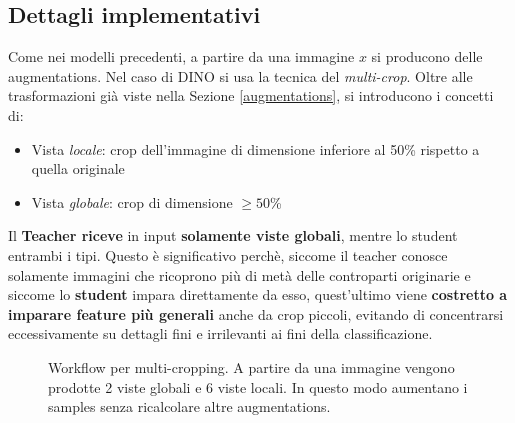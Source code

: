 \subsection{Dettagli implementativi}
Come nei modelli precedenti, a partire da una immagine \(x\) si producono delle augmentations. Nel caso di DINO si usa la tecnica del \textit{multi-crop}. Oltre alle trasformazioni già viste nella Sezione \ref{augmentations}, si introducono i concetti di:
\begin{itemize}
    \item Vista \textit{locale}: crop dell'immagine di dimensione inferiore al 50\% rispetto a quella originale
    \item Vista \textit{globale}: crop di dimensione \(\geq 50\)\%
\end{itemize}
Il \textbf{Teacher riceve} in input \textbf{solamente viste globali}, mentre lo student entrambi i tipi. Questo è significativo perchè, siccome il teacher conosce solamente immagini che ricoprono più di metà delle controparti originarie e siccome lo \textbf{student} impara direttamente da esso, quest'ultimo viene \textbf{costretto a imparare feature più generali} anche da crop piccoli, evitando di concentrarsi eccessivamente su dettagli fini e irrilevanti ai fini della classificazione.
\vspace{-1.1cm}
\begin{center}
    \begin{figure}[b]
        \centering
        \vspace{3mm}
        \caption{Workflow per multi-cropping. A partire da una immagine vengono prodotte 2 viste globali e 6 viste locali. In questo modo aumentano i samples senza ricalcolare altre augmentations.}
        \label{fig:multicrop}
    \end{figure}
\end{center}

